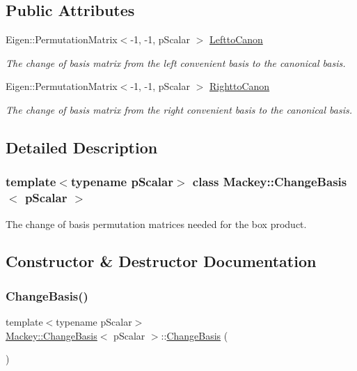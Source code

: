 \subsection*{Public Attributes}
\begin{DoxyCompactItemize}
\item 
Eigen\+::\+Permutation\+Matrix$<$-\/1, -\/1, p\+Scalar $>$ \hyperlink{classMackey_1_1ChangeBasis_a784f69cb8de92e84fef755461c60d3d0}{Leftto\+Canon}
\begin{DoxyCompactList}\small\item\em The change of basis matrix from the left convenient basis to the canonical basis. \end{DoxyCompactList}\item 
Eigen\+::\+Permutation\+Matrix$<$-\/1, -\/1, p\+Scalar $>$ \hyperlink{classMackey_1_1ChangeBasis_aa169c2e7937437ea2102de1c3072194c}{Rightto\+Canon}
\begin{DoxyCompactList}\small\item\em The change of basis matrix from the right convenient basis to the canonical basis. \end{DoxyCompactList}\end{DoxyCompactItemize}


\subsection{Detailed Description}
\subsubsection*{template$<$typename p\+Scalar$>$\newline
class Mackey\+::\+Change\+Basis$<$ p\+Scalar $>$}

The change of basis permutation matrices needed for the box product. 

\subsection{Constructor \& Destructor Documentation}
\mbox{\label{classMackey_1_1ChangeBasis_a1200b696d4b6db9ad942ee583c320a50}} 
\subsubsection{\texorpdfstring{Change\+Basis()}{ChangeBasis()}\hspace{0.1cm}{\footnotesize\ttfamily [1/3]}}
{\footnotesize\ttfamily template$<$typename p\+Scalar$>$ \\
\hyperlink{classMackey_1_1ChangeBasis}{Mackey\+::\+Change\+Basis}$<$ p\+Scalar $>$\+::\hyperlink{classMackey_1_1ChangeBasis}{Change\+Basis} (\begin{DoxyParamCaption}{ }\end{DoxyParamCaption})\hspace{0.3cm}{\ttfamily [inline]}}




